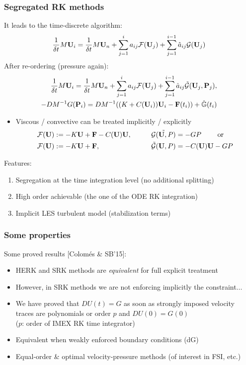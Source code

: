\begin{frame}
\frametitle{Segregated RK methods}
It leads to the time-discrete algorithm:
\begin{align*}
\frac{1}{\delta t}M{\bf U}_i=\frac{1}{\delta t}M{\bf U}_n+\sum_{j=1}^ia_{ij}\mathcal{F}({\bf U}_j)+\sum_{j=1}^{i-1}\hat{a}_{ij}\mathcal{G}({\bf U}_j)
\end{align*}
After re-ordering (pressure again):
\begin{align*}
\frac{1}{\delta t}M{\bf U}_i=\frac{1}{\delta t}M{\bf U}_n+\sum_{j=1}^ia_{ij}\mathcal{F}({\bf U}_j)+\sum_{j=1}^{i-1}\hat{a}_{ij}  \tilde{\mathcal{G}}({\bf U}_j,{\bf P}_j),\\
- DM^{-1}G ({\bf P}_i)=DM^{-1}((K+C({\bf U}_i)){\bf U}_i - {\bf F}(t_i)) +\dot{\mathbb{G}}(t_i)
\end{align*}
\begin{overprint}
\begin{itemize}
\item Viscous / convective can be treated implicitly / explicitly
\begin{align*}
&\mathcal{F}({\bf U}) :=-K{\bf U} + {\bf F} - C({\bf U}){\bf U}, \qquad &&\tilde{\mathcal{G}({\bf U},P)} = -G P \qquad 
\hbox{ or } \\
&\mathcal{F}({\bf U}) :=-K{\bf U} + {\bf F},  \qquad && \tilde{\mathcal{G}}({\bf U},P) = - C({\bf U}){\bf U} - G P
\end{align*}
\end{itemize}
Features:
\begin{enumerate}
\item Segregation at the time integration level (no additional splitting)
\item High order achievable (the one of the ODE RK integration)
\item Implicit LES turbulent model (stabilization terms)
\end{enumerate}
\end{overprint}
\end{frame}
\begin{frame}
\frametitle{Some properties}
\vfill
Some proved results [Colom\'es \& SB'15]:
\begin{itemize}
\item HERK and SRK methods are \emph{equivalent} for full explicit treatment
\item However, in SRK methods we are not enforcing implicitly the constraint...
\item We have proved that $D U(t) = G$ as soon as strongly imposed velocity traces are polynomials or order $p$ and $D U(0) = G(0)$
\\ {\small ($p$: order of IMEX RK time integrator) }
\item Equivalent when weakly enforced boundary conditions (dG)
\item Equal-order \& optimal velocity-pressure methods (of interest in FSI, etc.)
\end{itemize}
\vfill
\end{frame}

